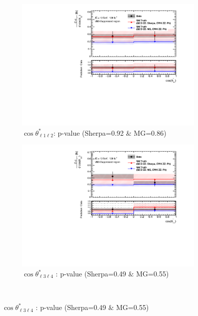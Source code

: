 \begin{figure}[!htb]
    \centering
    \begin{subfigure}{.49\textwidth}
        \centering
        \includegraphics[width=.98\linewidth]{figures/Results/CrossSection_VBSSuppressed/xs_cosThetaStar1_CR.pdf}
        \caption{ \footnotesize{$\cos \theta^{*}_{\ell 1 \ell 2}$}: p-value (Sherpa=0.92 $\&$ MG=0.86)}
    \end{subfigure}
    \begin{subfigure}{.49\textwidth}
        \centering
        \includegraphics[width=.98\linewidth]{figures/Results/CrossSection_VBSSuppressed/xs_cosThetaStar3_CR.pdf}
        \caption{ \footnotesize{$\cos \theta^{*}_{\ell 3 \ell 4}$ }: p-value (Sherpa=0.49 $\&$ MG=0.55)}
    \end{subfigure}\\

\end{figure}
